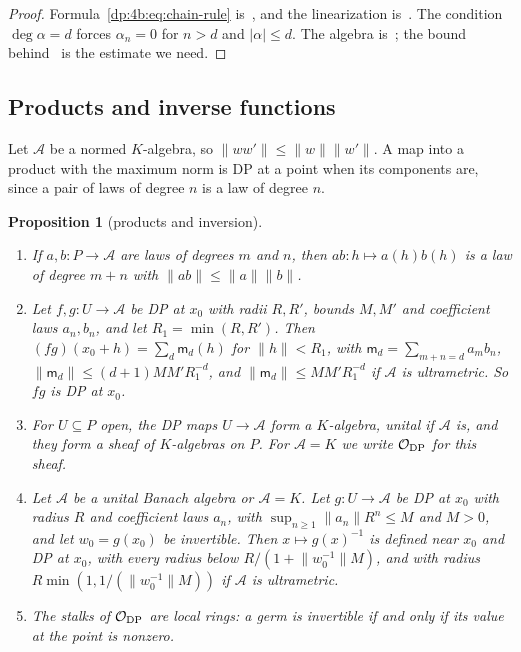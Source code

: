 \documentclass[11pt]{amsart}
\newtheorem{proposition}[theorem]{Proposition}
\theoremstyle{definition}
\theoremstyle{remark}
\numberwithin{equation}{section}
\newcommand{\abs}[1]{\lvert #1\rvert}
\newcommand{\norm}[1]{\lVert #1\rVert}
\theoremstyle{plain}
\theoremstyle{definition}
\theoremstyle{plain}
\begin{document}
\begin{proof}
Formula~\eqref{dp:4b:eq:chain-rule} is~\cite[Lemma~Q.3]{I}, and the linearization is~\cite[Lemma~Q.4]{I}. The condition $\deg\alpha=d$ forces $\alpha_n=0$ for $n>d$ and $\abs\alpha\le d$. The algebra is~\cite[VI~\S8, Prop.~VI.6, Cor.; Prop.~I.2; II~\S1]{Ro}; the bound behind~\cite[Lemma~Q.3]{I} is the estimate we need.
\end{proof}

\subsection{Products and inverse functions}\label{dp:ssec:inverse}

Let $\mathcal A$ be a normed $K$\nobreakdash-algebra, so $\norm{ww'}\le\norm w\norm{w'}$. A map into a product with the maximum norm is DP at a point when its components are, since a pair of laws of degree $n$ is a law of degree $n$.

\begin{proposition}[products and inversion]\label{dp:prop:products}
\leavevmode
\begin{enumerate}
\item If $a,b\colon P\to\mathcal A$ are laws of degrees $m$ and $n$, then $ab\colon h\mapsto a(h)b(h)$ is a law of degree $m+n$ with $\norm{ab}\le\norm a\norm b$.
\item Let $f,g\colon U\to\mathcal A$ be DP at $x_0$ with radii $R,R'$, bounds $M,M'$ and coefficient laws $a_n,b_n$, and let $R_1=\min(R,R')$. Then $(fg)(x_0+h)=\sum_d\mathsf m_d(h)$ for $\norm h<R_1$, with $\mathsf m_d=\sum_{m+n=d}a_mb_n$, $\norm{\mathsf m_d}\le(d+1)MM'R_1^{-d}$, and $\norm{\mathsf m_d}\le MM'R_1^{-d}$ if $\mathcal A$ is ultrametric. So $fg$ is DP at $x_0$.
\item For $U\subseteq P$ open, the DP maps $U\to\mathcal A$ form a $K$\nobreakdash-algebra, unital if $\mathcal A$ is, and they form a sheaf of $K$\nobreakdash-algebras on $P$. For $\mathcal A=K$ we write $\mathcal O_{\rm DP}$ for this sheaf.
\item Let $\mathcal A$ be a unital Banach algebra or $\mathcal A=K$. Let $g\colon U\to\mathcal A$ be DP at $x_0$ with radius $R$ and coefficient laws $a_n$, with $\sup_{n\ge1}\norm{a_n}R^n\le M$ and $M>0$, and let $w_0=g(x_0)$ be invertible. Then $x\mapsto g(x)^{-1}$ is defined near $x_0$ and DP at $x_0$, with every radius below $R/(1+\norm{w_0^{-1}}M)$, and with radius $R\min(1,1/(\norm{w_0^{-1}}M))$ if $\mathcal A$ is ultrametric.
\item The stalks of $\mathcal O_{\rm DP}$ are local rings: a germ is invertible if and only if its value at the point is nonzero.
\end{enumerate}
\end{proposition}
\end{document}
